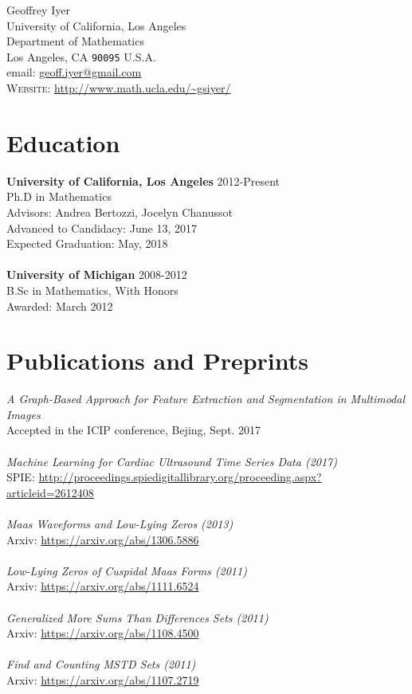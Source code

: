 \documentclass[10pt, a4paper]{article}
\begin{document}
{\LARGE Geoffrey Iyer}\\[1cm]
 University of California, Los Angeles\\
Department of Mathematics\\
Los Angeles, CA \texttt{90095}
U.S.A.\\[.2cm]
email: \href{mailto:geoff.iyer@gmail.com}{geoff.iyer@gmail.com}\\
\textsc{Website}: \url{http://www.math.ucla.edu/~gsiyer/}\\ 

\section*{Education}
\noindent
\textbf{University of California, Los Angeles} \hfill 2012-Present\\
Ph.D in Mathematics\\
Advisors: Andrea Bertozzi, Jocelyn Chanussot\\
Advanced to Candidacy: June 13, 2017\\
Expected Graduation: May, 2018\\
\\
\textbf{University of Michigan} \hfill 2008-2012\\
B.Sc in Mathematics, With Honors\\
Awarded: March 2012\\

\section*{Publications and Preprints}
\textit{A Graph-Based Approach for Feature Extraction and Segmentation in Multimodal Images} \\
Accepted in the ICIP conference, Bejing, Sept. 2017
\\ \\
\textit{Machine Learning for Cardiac Ultrasound Time Series Data (2017)}\\
SPIE: \url{http://proceedings.spiedigitallibrary.org/proceeding.aspx?articleid=2612408}
\\ \\
\textit{Maas Waveforms and Low-Lying Zeros (2013)} \\
Arxiv: \url{https://arxiv.org/abs/1306.5886}
\\ \\
\textit{Low-Lying Zeros of Cuspidal Maas Forms (2011)} \\
Arxiv: \url{https://arxiv.org/abs/1111.6524}
\\ \\
\textit{Generalized More Sums Than Differences Sets (2011)} \\
Arxiv: \url{https://arxiv.org/abs/1108.4500}
\\ \\
\textit{Find and Counting MSTD Sets (2011)} \\
Arxiv: \url{https://arxiv.org/abs/1107.2719}
\end{document}

